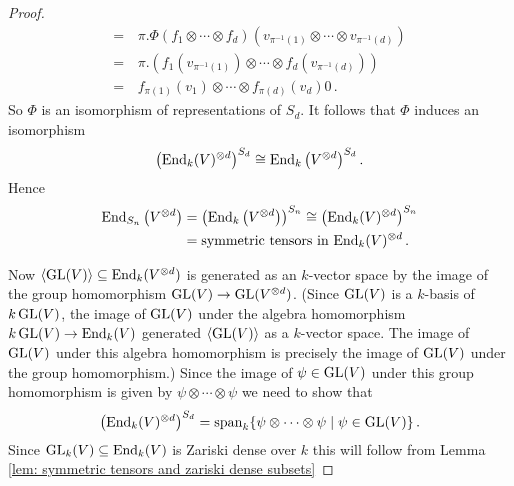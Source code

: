 \begin{proof}
\begin{align*}
    =&\,  \pi.\Phi(f_1 \otimes \dotsb \otimes f_d)\left( v_{\pi^{-1}(1)} \otimes \dotsb \otimes v_{\pi^{-1}(d)} \right) \\
    =&\,  \pi.\left( f_1\left(v_{\pi^{-1}(1)}\right) \otimes \dotsb \otimes f_d\left(v_{\pi^{-1}(d)}\right) \right) \\
    =&\,  f_{\pi(1)}(v_1) \otimes \dotsb \otimes f_{\pi(d)}(v_d)0\,.
  \end{align*}
  So $\Phi$ is an isomorphism of representations of $S_d$. It follows that $\Phi$ induces an isomorphism
  \[
          \left( \operatorname{End}_k(V)^{\otimes d} \right)^{S_d}
    \cong \operatorname{End}_k \left(V^{\otimes d}\right)^{S_d}.
  \]
  Hence
  \begin{align*}
          \operatorname{End}_{S_n}\left( V^{\otimes d} \right)
    &=    \left( \operatorname{End}_k\left( V^{\otimes d} \right) \right)^{S_n}
    \cong \left( \operatorname{End}_k(V)^{\otimes d} \right)^{S_n} \\
    &=    \text{symmetric tensors in $\operatorname{End}_k(V)^{\otimes d}$} \,.
  \end{align*}
  
  Now $\left\langle \operatorname{GL}(V) \right\rangle \subseteq \operatorname{End}_k(V^{\otimes d})$ is generated as an $k$-vector space by the image of the group homomorphism $\operatorname{GL}(V) \to \operatorname{GL}(V^{\otimes d})$.
  (Since $\operatorname{GL}(V)$ is a $k$-basis of $k\operatorname{GL}(V)$, the image of $\operatorname{GL}(V)$ under the algebra homomorphism $k \operatorname{GL}(V) \to \operatorname{End}_k(V)$ generated $\left\langle \operatorname{GL}(V) \right\rangle$ as a $k$-vector space.
  The image of $\operatorname{GL}(V)$ under this algebra homomorphism is precisely the image of $\operatorname{GL}(V)$ under the group homomorphism.)
  Since the image of $\psi \in \operatorname{GL}(V)$ under this group homomorphism is given by $\psi \otimes \dotsb \otimes \psi$ we need to show that
  \[
      \left( \operatorname{End}_k(V)^{\otimes d} \right)^{S_d}
    = \operatorname{span}_k  \{
                  \psi \otimes \dotsb \otimes \psi
                \mid
                  \psi \in \operatorname{GL}(V)
                \} \,.
  \]
  Since $\operatorname{GL}_k(V) \subseteq \operatorname{End}_k(V)$ is Zariski dense over $k$ this will follow from Lemma \ref{lem: symmetric tensors and zariski dense subsets}
\end{proof}


